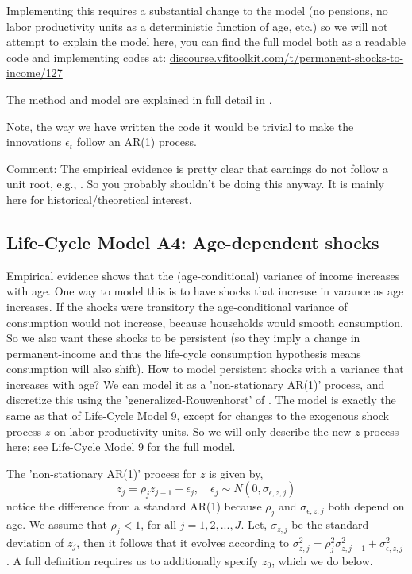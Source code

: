 Implementing this requires a substantial change to the model (no pensions, no labor productivity units as a deterministic function of age, etc.) so we will not attempt to explain the model here, you can find the full model both as a readable code and implementing codes at: \href{http://discourse.vfitoolkit.com/t/permanent-shocks-to-income/127}{discourse.vfitoolkit.com/t/permanent-shocks-to-income/127}

The method and model are explained in full detail in \cite*{Carroll2021}.

Note, the way we have written the code it would be trivial to make the innovations $\epsilon_t$ follow an AR(1) process.

Comment: The empirical evidence is pretty clear that earnings do not follow a unit root, e.g.,  \cite*{GuvenenKarahanOzkanSong2021}. So you probably shouldn't be doing this anyway. It is mainly here for historical/theoretical interest.


\subsection{Life-Cycle Model A4: Age-dependent shocks}
Empirical evidence shows that the (age-conditional) variance of income increases with age. One way to model this is to have shocks that increase in varance as age increases. If the shocks were transitory the age-conditional variance of consumption would not increase, because households would smooth consumption. So we also want these shocks to be persistent (so they imply a change in permanent-income and thus the life-cycle consumption hypothesis means consumption will also shift). How to model persistent shocks with a variance that increases with age? We can model it as a 'non-stationary AR(1)' process, and discretize this using the 'generalized-Rouwenhorst' of \cite*{FellaGallipoliPan2019}. The model is exactly the same as that of Life-Cycle Model 9, except for changes to the exogenous shock process $z$ on labor productivity units. So we will only describe the new $z$ process here; see Life-Cycle Model 9 for the full model.

The 'non-stationary AR(1)' process for $z$ is given by,
\begin{equation*}
 z_j=\rho_j z_{j-1} + \epsilon_j, \quad \epsilon_j \sim N(0,\sigma_{\epsilon,z,j})
\end{equation*}
notice the difference from a standard AR(1) because $\rho_j$ and $\sigma_{\epsilon,z,j}$ both depend on age. We assume that $\rho_j<1$, for all $j=1,2,...,J$. Let, $\sigma_{z,j}$ be the standard deviation of $z_j$, then it follows that it evolves according to $\sigma_{z,j}^2=\rho_j^2 \sigma_{z,j-1}^2 + \sigma_{\epsilon,z,j}^2$. A full definition requires us to additionally specify $z_0$, which we do below.

